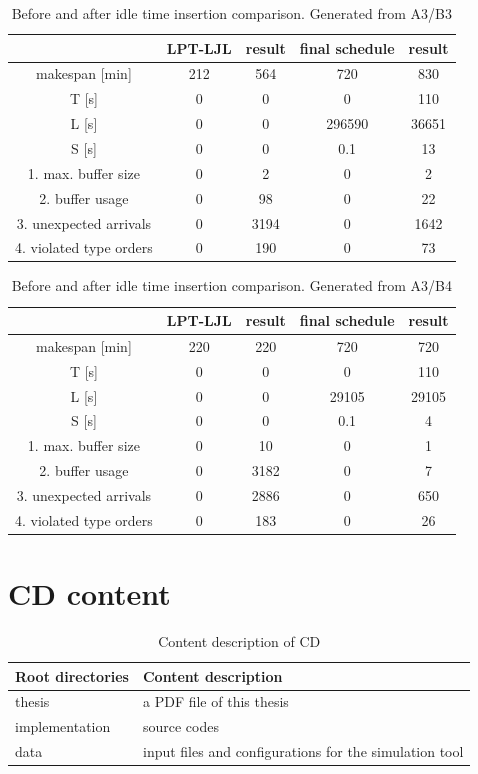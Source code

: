 \documentclass{ctuthesis}
\begin{document}
\begin{table}[H]
\begin{tabular}{ |c|| c | c | c | c |} 
\hline
 & LPT-LJL & result & final schedule & result \\ 
\hline
makespan [min] & 212 & 564 & 720 & 830 \\
\hline
T [s]& 0 & 0 & 0 & 110 \\
\hline
L [s]& 0 & 0 & 296590 & 36651 \\
\hline
S [s]& 0 & 0 & 0.1 & 13 \\
\hline
1. max. buffer size & 0 & 2 & 0 & 2\\ 
\hline
2. buffer usage  & 0 & 98 & 0 & 22\\ 
\hline
3. unexpected arrivals & 0 & 3194 & 0 & 1642\\ 
\hline
4. violated type orders & 0 & 190 & 0 & 73\\ 
\hline
\end{tabular}
\caption{Before and after idle time insertion comparison. Generated from A3/B3}
\end{table}

\begin{table}[H]
\begin{tabular}{ |c|| c | c | c | c |} 
\hline
 & LPT-LJL & result & final schedule & result \\ 
\hline
makespan [min] & 220 & 220 & 720 & 720 \\
\hline
T [s]& 0 & 0 & 0 & 110 \\
\hline
L [s]& 0 & 0 & 29105 & 29105 \\
\hline
S [s]& 0 & 0 & 0.1 & 4 \\
\hline
1. max. buffer size & 0 & 10 & 0 & 1\\ 
\hline
2. buffer usage  & 0 & 3182 & 0 & 7\\ 
\hline
3. unexpected arrivals & 0 & 2886 & 0 & 650\\ 
\hline
4. violated type orders & 0 & 183 & 0 & 26\\ 
\hline
\end{tabular}
\caption{Before and after idle time insertion comparison. Generated from A3/B4}
\end{table}


\chapter{CD content}

\begin{table}[H]
\begin{tabular}{  l  l } 
\hline
 \textbf{Root directories} & \textbf{Content description} \\ 
 \hline
thesis & a PDF file of this thesis \\
implementation & source codes \\
data & input files and configurations for the simulation tool \\
\hline
\end{tabular}
\caption{Content description of CD}
\end{table}
\end{document}
